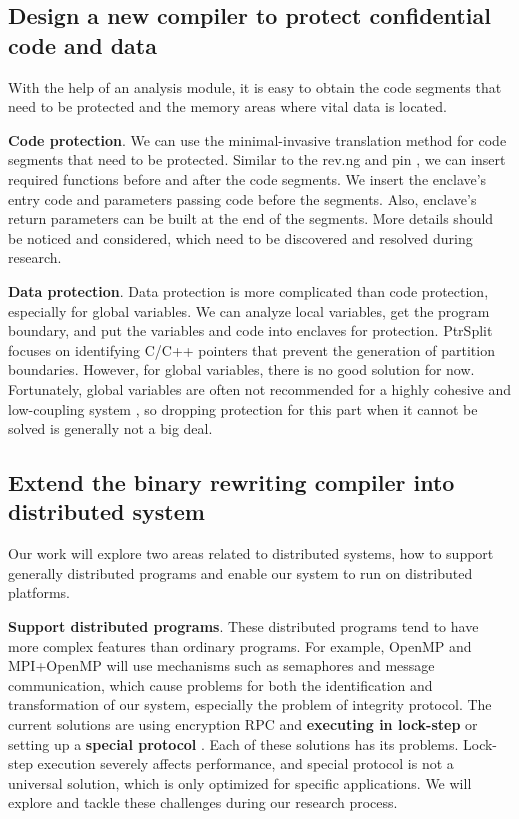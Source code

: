 \subsection{Design a new compiler to protect confidential code and data}
\label{sec:ToolToRewrite}
With the help of an analysis module, it is easy to obtain the code segments that need
to be protected and the memory areas where vital data is located.

\textbf{Code protection}. We can use the minimal-invasive translation method for
code segments that need to be protected. Similar to the rev.ng \cite{Federico2017revngAU}
and pin \cite{Luk2005PinBC}, we can insert required functions before and
after the code segments. We insert the enclave's entry code and parameters passing code
before the segments. Also, enclave's return parameters can be built at the end of the segments.
More details should be noticed and considered, which need to be
discovered and resolved during research.

\textbf{Data protection}. Data protection is more complicated than code protection,
especially for global variables.
We can analyze local variables, get the program boundary, and put the
variables and code into enclaves for protection.
PtrSplit \cite{Liu2017PtrSplitSG} focuses on identifying C/C++ pointers
that prevent the generation of partition boundaries.
However, for global variables, there is no good solution for now. Fortunately,
global variables are often not recommended for a highly cohesive and low-coupling system
\cite{GlobalVariablesAreBad, GlobalVariablesAreEvil},
so dropping protection for this part when it cannot be solved is generally not a big deal.

\subsection{Extend the binary rewriting compiler into distributed system}
\label{sec:ToolToDistributedSystem}
Our work will explore two areas related to distributed systems, how to support generally distributed
programs and enable our system to run on distributed platforms.

\textbf{Support distributed programs}.
These distributed programs tend to have more complex features than ordinary programs.
For example, OpenMP \cite{Dagum1998OpenMPAI} and MPI+OpenMP \cite{Klinkenberg2020CHAMELEONRL}
will use mechanisms such as semaphores and message communication, which cause problems
for both the identification and transformation of our system, especially the problem of integrity protocol.
The current solutions are using encryption RPC and \textbf{executing in lock-step} \cite{Shinde2017PanoplyLL}
or setting up a \textbf{special protocol} \cite{Schuster2015VC3TD, Priebe2018EnclaveDBAS}.
Each of these solutions has its problems. Lock-step execution severely affects performance,
and special protocol is not a universal solution, which is only optimized for specific applications.
We will explore and tackle these challenges during our research process.

